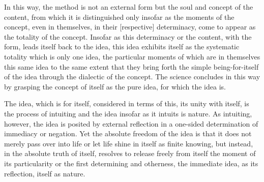 In this way, the method is not an external form
but the soul and concept of the content,
from which it is distinguished only insofar as
the moments of the concept, even in themselves,
in their [respective] determinacy,
come to appear as the totality of the concept.
Insofar as this determinacy or the content, with the form,
leads itself back to the idea,
this idea exhibits itself as
the systematic totality which is only one idea,
the particular moments of which are
in themselves this same idea
to the same extent that they bring forth
the simple being-for-itself of the idea
through the dialectic of the concept.
The science concludes in this way
by grasping the concept of itself
as the pure idea,
for which the idea is.

The idea, which is for itself,
considered in terms of this,
its unity with itself,
is the process of intuiting
and the idea insofar as it intuits is nature.
As intuiting, however,
the idea is posited by external reflection
in a one-sided determination of immediacy or negation.
Yet the absolute freedom of the idea is
that it does not merely pass over into life
or let life shine in itself as finite knowing,
but instead, in the absolute truth of itself,
resolves to release freely from itself
the moment of its particularity
or the first determining and otherness,
the immediate idea, as its reflection,
itself as nature.
